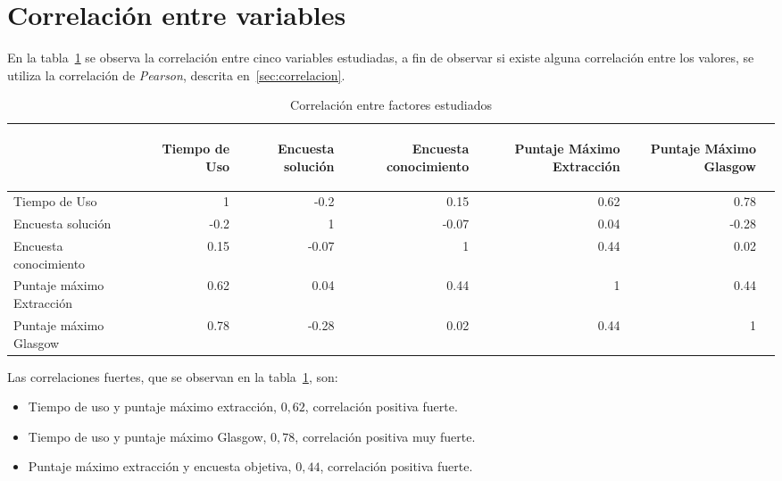 \section{Correlación entre variables}

En la tabla~\ref{tab:all_correlation} se observa la correlación entre cinco
variables estudiadas, a fin de observar si existe alguna correlación entre los
valores, se utiliza la correlación de \emph{Pearson}, descrita
en~\ref{sec:correlacion}.

\begin{table}[H]
\centering
\begin{tabular}{lrrrrrr}
\toprule
        &
\begin{sideways}\textbf{Tiempo de Uso}\end{sideways}             &
\begin{sideways}\textbf{Encuesta solución}\end{sideways}        &
\begin{sideways}\textbf{Encuesta conocimiento}\end{sideways}         &
\begin{sideways}\textbf{Puntaje Máximo Extracción}\end{sideways} &
\begin{sideways}\textbf{Puntaje Máximo Glasgow}\end{sideways}    \\
\midrule
Tiempo de Uso             & 1    & -0.2  & 0.15  & 0.62 & 0.78 \\
Encuesta solución         & -0.2 & 1     & -0.07 & 0.04 & -0.28\\
Encuesta conocimiento     & 0.15 & -0.07 & 1     & 0.44 & 0.02 \\
Puntaje máximo Extracción & 0.62 & 0.04  & 0.44  & 1    & 0.44 \\
Puntaje máximo Glasgow    & 0.78 & -0.28 & 0.02  & 0.44 & 1    \\
\bottomrule               
\end{tabular}
\caption{Correlación entre factores estudiados} 
\label{tab:all_correlation}
\end{table}

Las correlaciones fuertes, que se observan en la
tabla~\ref{tab:all_correlation}, son:

\begin{itemize}
    \item Tiempo de uso y puntaje máximo extracción, $0,62$, correlación
        positiva fuerte.
    \item Tiempo de uso y puntaje máximo Glasgow, $0,78$, correlación positiva
        muy fuerte.
    \item Puntaje máximo extracción y encuesta objetiva, $0,44$, correlación
        positiva fuerte.
\end{itemize}


